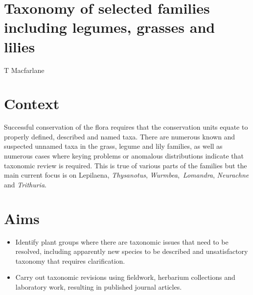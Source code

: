 \documentclass[version=last,
    paper=a4, %
    10pt, %
    usenames,
    dvipsnames,
    oneside, %
    headings=openany, %
    DIV=15 %
]{scrbook}
\begin{document}
\section*{Taxonomy of selected families including legumes, grasses and lilies
}

T Macfarlane


\section*{Context}
Successful conservation of the flora requires that the conservation
units equate to properly defined, described and named taxa. There are
numerous known and suspected unnamed taxa in the grass, legume and lily
families, as well as numerous cases where keying problems or anomalous
distributions indicate that taxonomic review is required. This is true
of various parts of the families but the main current focus is on
Lepilaena, \emph{Thysanotus}, \emph{Wurmbea},~\emph{Lomandra},
\emph{Neurachne} and \emph{Trithuria}.



\section*{Aims}
\begin{itemize}
\itemsep1pt\parskip0pt
\item
  Identify plant groups where there are taxonomic issues that need to be
  resolved, including apparently new species to be described and
  unsatisfactory taxonomy that requires clarification.
\item
  Carry out taxonomic revisions using fieldwork, herbarium collections
  and laboratory work, resulting in published journal articles.
\end{itemize}
\end{document}

